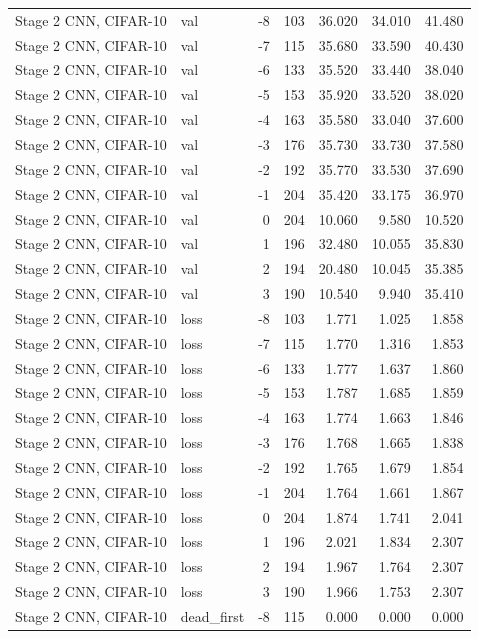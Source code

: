 \begin{table}[htbp]
{\begin{tabular}{@{}llrrrrr@{}}
Stage 2 CNN, CIFAR-10 & val & -8 & 103 & 36.020 & 34.010 & 41.480 \\
Stage 2 CNN, CIFAR-10 & val & -7 & 115 & 35.680 & 33.590 & 40.430 \\
Stage 2 CNN, CIFAR-10 & val & -6 & 133 & 35.520 & 33.440 & 38.040 \\
Stage 2 CNN, CIFAR-10 & val & -5 & 153 & 35.920 & 33.520 & 38.020 \\
Stage 2 CNN, CIFAR-10 & val & -4 & 163 & 35.580 & 33.040 & 37.600 \\
Stage 2 CNN, CIFAR-10 & val & -3 & 176 & 35.730 & 33.730 & 37.580 \\
Stage 2 CNN, CIFAR-10 & val & -2 & 192 & 35.770 & 33.530 & 37.690 \\
Stage 2 CNN, CIFAR-10 & val & -1 & 204 & 35.420 & 33.175 & 36.970 \\
Stage 2 CNN, CIFAR-10 & val & 0 & 204 & 10.060 & 9.580 & 10.520 \\
Stage 2 CNN, CIFAR-10 & val & 1 & 196 & 32.480 & 10.055 & 35.830 \\
Stage 2 CNN, CIFAR-10 & val & 2 & 194 & 20.480 & 10.045 & 35.385 \\
Stage 2 CNN, CIFAR-10 & val & 3 & 190 & 10.540 & 9.940 & 35.410 \\
Stage 2 CNN, CIFAR-10 & loss & -8 & 103 & 1.771 & 1.025 & 1.858 \\
Stage 2 CNN, CIFAR-10 & loss & -7 & 115 & 1.770 & 1.316 & 1.853 \\
Stage 2 CNN, CIFAR-10 & loss & -6 & 133 & 1.777 & 1.637 & 1.860 \\
Stage 2 CNN, CIFAR-10 & loss & -5 & 153 & 1.787 & 1.685 & 1.859 \\
Stage 2 CNN, CIFAR-10 & loss & -4 & 163 & 1.774 & 1.663 & 1.846 \\
Stage 2 CNN, CIFAR-10 & loss & -3 & 176 & 1.768 & 1.665 & 1.838 \\
Stage 2 CNN, CIFAR-10 & loss & -2 & 192 & 1.765 & 1.679 & 1.854 \\
Stage 2 CNN, CIFAR-10 & loss & -1 & 204 & 1.764 & 1.661 & 1.867 \\
Stage 2 CNN, CIFAR-10 & loss & 0 & 204 & 1.874 & 1.741 & 2.041 \\
Stage 2 CNN, CIFAR-10 & loss & 1 & 196 & 2.021 & 1.834 & 2.307 \\
Stage 2 CNN, CIFAR-10 & loss & 2 & 194 & 1.967 & 1.764 & 2.307 \\
Stage 2 CNN, CIFAR-10 & loss & 3 & 190 & 1.966 & 1.753 & 2.307 \\
Stage 2 CNN, CIFAR-10 & dead\_first & -8 & 115 & 0.000 & 0.000 & 0.000 \\

\end{tabular}}
\end{table}
